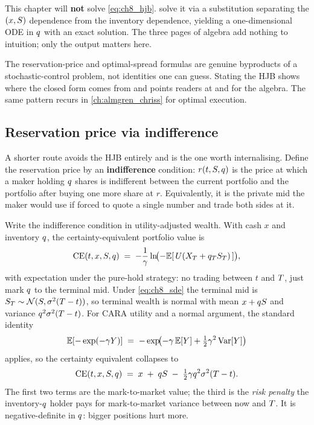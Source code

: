 This chapter will \textbf{not} solve \eqref{eq:ch8_hjb}.
\citet{avellaneda2008high} solve it via a substitution separating
the $(x, S)$ dependence from the inventory dependence, yielding a
one-dimensional ODE in $q$ with an exact solution. The three
pages of algebra add nothing to intuition; only the output matters
here.

\begin{remark}
The reservation-price and optimal-spread formulas are genuine
byproducts of a stochastic-control problem, not identities one can
guess. Stating the HJB shows where the closed form comes from and
points readers at \citeAS{} and \citeCartea{} for the algebra. The
same pattern recurs in \cref{ch:almgren_chriss} for optimal
execution.
\end{remark}

\subsection{Reservation price via indifference}
\label{subsec:ch8_indifference}

A shorter route avoids the HJB entirely and is the one worth
internalising. Define the reservation price by an
\textbf{indifference} condition: $r(t, S, q)$ is the price at
which a maker holding $q$ shares is indifferent between the
current portfolio and the portfolio after buying one more share at
$r$. Equivalently, it is the private mid the maker would use if
forced to quote a single number and trade both sides at it.

Write the indifference condition in utility-adjusted wealth. With
cash $x$ and inventory $q$, the certainty-equivalent portfolio
value is
\begin{equation}
  \mathrm{CE}(t, x, S, q)
  \;=\; -\frac{1}{\gamma} \ln\!\bigl(-\mathbb{E}[\,U(X_T +
         q_T S_T)\,]\bigr),
\end{equation}
with expectation under the pure-hold strategy: no trading between
$t$ and $T$, just mark $q$ to the terminal mid. Under
\eqref{eq:ch8_sde} the terminal mid is
$S_T \sim \mathcal{N}(S, \sigma^2(T - t))$, so terminal
wealth is normal with mean $x + q S$ and variance
$q^2 \sigma^2 (T - t)$. For CARA utility and a normal
argument, the standard identity
\begin{equation}
  \mathbb{E}[-\exp(-\gamma Y)]
  \;=\; -\exp\!\bigl(-\gamma\,\mathbb{E}[Y] + \tfrac{1}{2}\gamma^2 \operatorname{Var}[Y]\bigr)
  \label{eq:ch8_cara_normal}
\end{equation}
applies, so the certainty equivalent collapses to
\begin{equation}
  \mathrm{CE}(t, x, S, q)
  \;=\; x \;+\; q S
      \;-\; \tfrac{1}{2}\gamma q^2 \sigma^2 (T - t).
  \label{eq:ch8_ce}
\end{equation}
The first two terms are the mark-to-market value; the third is the
\emph{risk penalty} the inventory-$q$ holder pays for
mark-to-market variance between now and $T$. It is
negative-definite in $q$: bigger positions hurt more.


